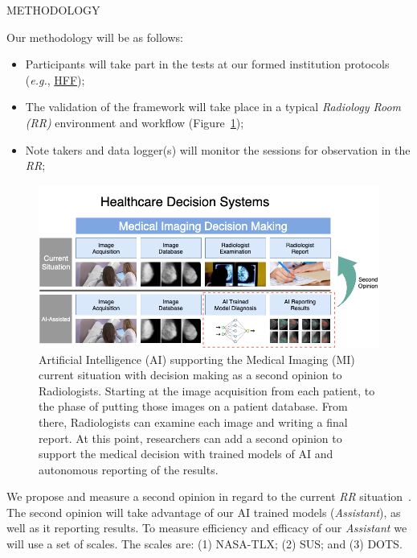 \documentclass[final]{beamer}
\begin{document}
\begin{frame}[t, fragile = singleslide]{}
\begin{columns}[t]
\begin{column}{0.45\textwidth}
\begin{block}{METHODOLOGY}

Our methodology will be as follows:

\begin{itemize}
\item Participants will take part in the tests at our formed institution protocols (\textit{e.g.}, \hyperlink{http://hff.min-saude.pt/}{HFF});
\item The validation of the framework will take place in a typical \textit{Radiology Room (RR)} environment and workflow (Figure~\ref{fig:fig001});
\item  Note takers and data logger(s) will monitor the sessions for observation in the \textit{RR};
\end{itemize}

\begin{figure}[!htb]
\centering
\caption{Artificial Intelligence (AI) supporting the Medical Imaging (MI) current situation with decision making as a second opinion to Radiologists. Starting at the image acquisition from each patient, to the phase of putting those images on a patient database. From there, Radiologists can examine each image and writing a final report. At this point, researchers can add a second opinion to support the medical decision with trained models of AI and autonomous reporting of the results.}
\label{fig:fig001}
\includegraphics[width = \columnwidth]{./figures/fig001}
\end{figure}

We propose and measure a second opinion in regard to the current \textit{RR} situation~\cite{https://doi.org/10.13140/rg.2.2.16566.14403/1}. The second opinion will take advantage of our AI trained models (\textit{Assistant}), as well as it reporting results. To measure efficiency and efficacy of our \textit{Assistant} we will use a set of scales. The scales are: (1) NASA-TLX; (2) SUS; and (3) DOTS.


\end{block}
\end{column}
\end{columns}
\end{frame}
\end{document}
